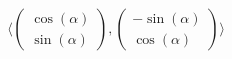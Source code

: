 \documentclass[preview]{standalone}
\begin{document}
\begin{align*}
\langle \begin{pmatrix} \cos(\alpha) \\ \sin(\alpha) \end{pmatrix}, \begin{pmatrix} -\sin(\alpha) \\ \cos(\alpha) \end{pmatrix} \rangle
\end{align*}
\end{document}
